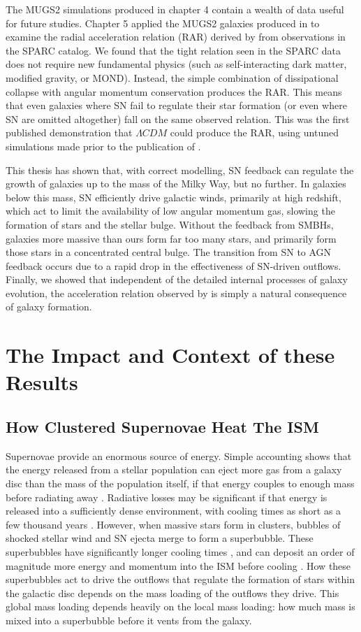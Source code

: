 The MUGS2 simulations produced in chapter 4 contain a wealth of data useful for
future studies. Chapter 5 applied the MUGS2 galaxies produced in
\citet{Keller2016a} to examine the radial acceleration relation (RAR) derived by
\citet{McGaugh2016} from observations in the SPARC \citep{Lelli2016b} catalog.
We found that the tight relation seen in the SPARC data does not require new
fundamental physics (such as self-interacting dark matter, modified gravity, or
MOND).  Instead, the simple combination of dissipational collapse with angular
momentum conservation produces the RAR. This means that even galaxies where SN
fail to regulate their star formation (or even where SN are omitted altogether)
fall on the same observed relation.  This was the first published demonstration
that $\Lambda CDM$ could produce the RAR, using untuned simulations made prior
to the publication of \citet{McGaugh2016}.

This thesis has shown that, with correct modelling, SN feedback can regulate the
growth of galaxies up to the mass of the Milky Way, but no further.  In galaxies
below this mass, SN efficiently drive galactic winds, primarily at
high redshift, which act to limit the availability of low angular momentum gas,
slowing the formation of stars and the stellar bulge. Without the
feedback from SMBHs, galaxies more massive than ours form far too many stars,
and primarily form those stars in a concentrated central bulge.  The transition
from SN to AGN feedback occurs due to a rapid drop in the effectiveness of
SN-driven outflows.  Finally, we showed that independent of the detailed
internal processes of galaxy evolution, the acceleration relation observed by
\citet{McGaugh2016} is simply a natural consequence of galaxy formation.

\section{The Impact and Context of these Results}
\subsection{How Clustered Supernovae Heat The ISM}
Supernovae provide an enormous source of energy.  Simple accounting shows that
the energy released from a stellar population can eject more gas from a galaxy
disc than the mass of the population itself, if that energy couples to enough
mass before radiating away \citep{Larson1974}.  Radiative losses may be
significant if that energy is released into a sufficiently dense environment,
with cooling times as short as a few thousand years \citep{Chevalier1974}.
However, when massive stars form in clusters, bubbles of shocked stellar wind
and SN ejecta merge to form a superbubble.  These superbubbles have
significantly longer cooling times \citep{MacLow1988}, and can deposit an order
of magnitude more energy and momentum into the ISM before cooling
\citet{Gentry2017}.  How these superbubbles act to drive the 
outflows that regulate the formation of stars within the galactic disc depends
on the mass loading of the outflows they drive.  This global mass loading
depends heavily on the local mass loading: how much mass is mixed into a
superbubble before it vents from the galaxy.

